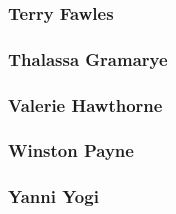 \subsubsection{Terry Fawles}
\label{people:fawles}

\subsubsection{Thalassa Gramarye}
\label{people:thalassa}

\subsubsection{Valerie Hawthorne}
\label{people:valerie}

\subsubsection{Winston Payne}
\label{people:wpayne}

\subsubsection{Yanni Yogi}
\label{people:yogi}
